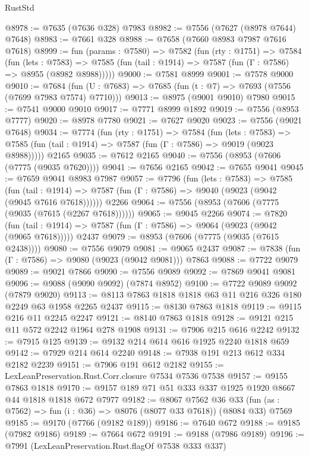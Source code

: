 \begin{lexlean}{RustStd}
\begin{coremodule}
{\begin{coremodule}
{{{{{{{{{{{{{{{{{{{{{{{{{{{{{{{{{{{{{{{{{{{@8978 := @7635 (@7636 @328) @7983
@8982 := @7556 (@7627 (@8978 @7644) @7648)
@8983 := @7661 @328
@8988 := @7658 (@7660 @8983 @7987 @7616 @7618)
@8999 := fun (params : @7580) =>
  @7582
    (fun (rty : @1751) =>
    @7584
      (fun (lets : @7583) =>
      @7585 (fun (tail : @1914) => @7587 (fun (Γ : @7586) => @8955 (@8982 @8988)))))
@9000 := @7581 @8999
@9001 := @7578 @9000
@9010 := @7684 (fun (U : @7683) => @7685 (fun (t : @7) => @7693 (@7556 (@7699 @7983 @7574) @7710)))
@9013 := @8975 (@9001 @9010) @7980
@9015 := @7541 @9000 @9010
@9017 := @7771 @8999 @1892
@9019 := @7556 (@8953 @7777)
@9020 := @8978 @7780
@9021 := @7627 @9020
@9023 := @7556 (@9021 @7648)
@9034 := @7774
    (fun (rty : @1751) =>
    @7584
      (fun (lets : @7583) =>
      @7585 (fun (tail : @1914) => @7587 (fun (Γ : @7586) => @9019 (@9023 @8988)))))
    @2165
@9035 := @7612 @2165
@9040 := @7556 (@8953 (@7606 (@7775 (@9035 @7620))))
@9041 := @7656 @2165
@9042 := @7655 @9041
@9045 := @7659 @9041 @8983 @7987
@9057 := @7796
    (fun (lets : @7583) =>
    @7585
      (fun (tail : @1914) => @7587 (fun (Γ : @7586) => @9040 (@9023 (@9042 (@9045 @7616 @7618))))))
    @2266
@9064 := @7556 (@8953 (@7606 (@7775 (@9035 (@7615 (@2267 @7618))))))
@9065 := @9045 @2266
@9074 := @7820
    (fun (tail : @1914) => @7587 (fun (Γ : @7586) => @9064 (@9023 (@9042 (@9065 @7618)))))
    @2437
@9079 := @8953 (@7606 (@7775 (@9035 (@7615 @2438))))
@9080 := @7556 @9079
@9081 := @9065 @2437
@9087 := @7838 (fun (Γ : @7586) => @9080 (@9023 (@9042 @9081))) @7863
@9088 := @7722 @9079
@9089 := @9021 @7866
@9090 := @7556 @9089
@9092 := @7869 @9041 @9081
@9096 := @9088 (@9090 @9092) (@7874 @8952)
@9100 := @7722 @9089 @9092 (@7879 @9020)
@9113 := @8113 @7863 @1818 @1818 @63 @11 @216 @326 @180 @2249 @63 @1958 @2265 @2437
@9115 := @8130 @7863 @1818
@9119 := @9115 @216 @11 @2245 @2247
@9121 := @8140 @7863 @1818
@9128 := @9121 @215 @11 @572 @2242 @1964 @278 @1908
@9131 := @7906 @215 @616 @2242
@9132 := @7915 @125
@9139 := @9132 @214 @614 @616 @1925 @2240 @1818 @659
@9142 := @7929 @214 @614 @2240
@9148 := @7938 @191 @213 @612 @334 @2182 @2239
@9151 := @7906 @191 @612 @2182
@9155 := LexLeanPreservation.Rust.Corr.closure @7534 @7536 @7538
@9157 := @9155 @7863 @1818
@9170 := @9157 @189 @71 @51 @333 @337 @1925 @1920 @8667 @44 @1818 @1818 @672 @7977
@9182 := @8067
    @7562
    @36
    @33
    (fun (as : @7562) => fun (i : @36) => @8076 (@8077 @33 @7618))
    (@8084 @33)
    @7569
@9185 := @9170 (@7766 (@9182 @189))
@9186 := @7640 @672
@9188 := @9185 (@7982 @9186)
@9189 := @7664 @672
@9191 := @9188 (@7986 @9189)
@9196 := @7991 (LexLeanPreservation.Rust.flagOf @7538 @333 @337)
}}}}}}}}}}}}}}}}}}}}}}}}}}}}}}}}}}}}}}}}}}}
\end{coremodule}}
\end{coremodule}
\end{lexlean}
